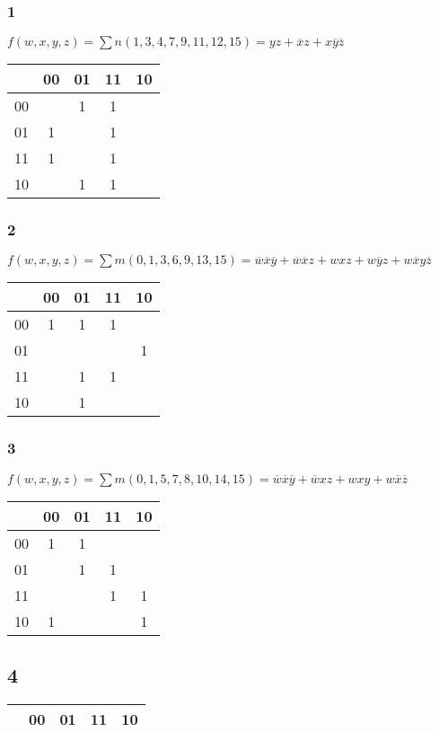 \documentclass[12pt,a4paper,openany]{book}
\begin{document}
	\subsubsection{1}
	$f(w,x,y,z) = \sum n(1,3,4,7,9,11,12,15) = yz+\overline x z + x\overline y \overline z$
	\\
	\begin{tabular}{c|c|c|c|c|}
		& 00&01&11&10\\
		\hline
		00&&1&1&\\
		\hline
		01&1&&1&\\
		\hline
		11&1&&1&\\
		\hline
		10&&1&1&\\
		\hline
	\end{tabular}
	\subsubsection{2}
	$f(w,x,y,z) = \sum m(0,1,3,6,9,13,15) = \overline w \overline x \overline y + \overline w \overline x z + wxz + w\overline y z+w\overline x y \overline z$\\
	\begin{tabular}{c|c|c|c|c|}
		& 00&01&11&10\\
		\hline
		00&1&1&1&\\
		\hline
		01&&&&1\\
		\hline
		11&&1&1&\\
		\hline
		10&&1&&\\
		\hline
	\end{tabular}
	\subsubsection{3}
	$f(w,x,y,z) = \sum m (0,1,5,7,8,10,14,15) = \overline w \overline x \overline y +  \overline w x z + wxy + w\overline x \overline  z$\\
	\begin{tabular}{c|c|c|c|c|}
		& 00&01&11&10\\
		\hline
		00&1&1&&\\
		\hline
		01&&1&1&\\
		\hline
		11&&&1&1\\
		\hline
		10&1&&&1\\
		\hline
	\end{tabular}

	\subsection{4}
	\begin{tabular}{c|c|c|c|c|}
		& 00&01&11&10\\
		\hline
	\end{tabular}
\end{document}
